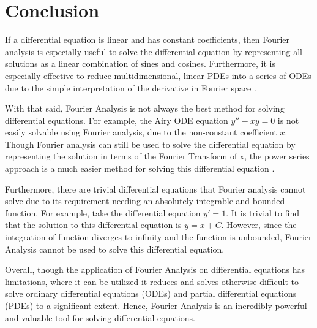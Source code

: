 \section{Conclusion}
\label{section:conclusion}
If a differential equation is linear and has constant coefficients, then Fourier analysis is especially useful to solve the differential equation by representing all solutions as a linear combination of sines and cosines. Furthermore, it is especially effective to reduce multidimensional, linear PDEs into a series of ODEs due to the simple interpretation of the derivative in Fourier space \citep{howell2016principles}.

With that said, Fourier Analysis is not always the best method for solving differential equations. For example, the Airy ODE equation $y'' - xy = 0$ is not easily solvable using Fourier analysis, due to the non-constant coefficient $x$. Though Fourier analysis can still be used to solve the differential equation by representing the solution in terms of the Fourier Transform of x, the power series approach is a much easier method for solving this differential equation \citep{craig1990linear}.


Furthermore, there are trivial differential equations that Fourier analysis cannot solve due to its requirement needing an absolutely integrable and bounded function. For example, take the differential equation $y' = 1$. It is trivial to find that the solution to this differential equation is $y = x + C$. However, since the integration of function diverges to infinity and the function is unbounded, Fourier Analysis cannot be used to solve this differential equation.


Overall, though the application of Fourier Analysis on differential equations has limitations, where it can be utilized it reduces and solves otherwise difficult-to-solve ordinary differential equations (ODEs) and partial differential equations (PDEs) to a significant extent. Hence, Fourier Analysis is an incredibly powerful and valuable tool for solving differential equations.